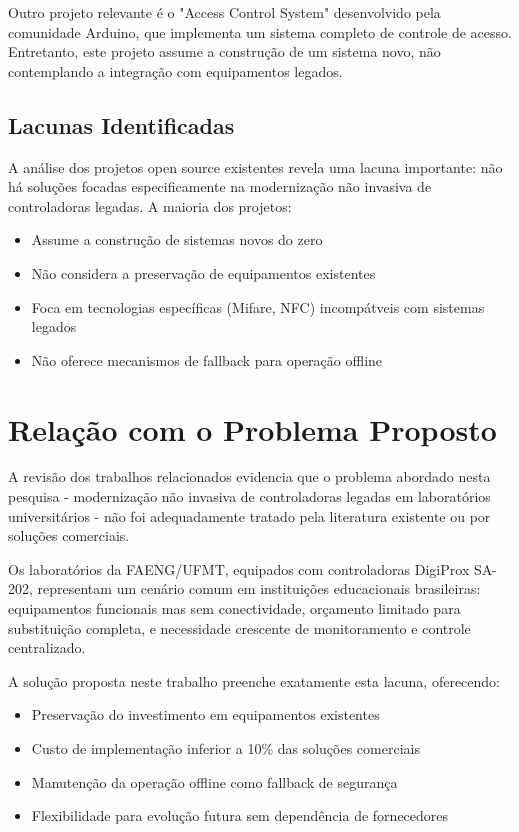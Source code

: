 Outro projeto relevante é o "Access Control System" desenvolvido pela comunidade Arduino, que implementa um sistema completo de controle de acesso. Entretanto, este projeto assume a construção de um sistema novo, não contemplando a integração com equipamentos legados.

\subsection{Lacunas Identificadas}

A análise dos projetos open source existentes revela uma lacuna importante: não há soluções focadas especificamente na modernização não invasiva de controladoras legadas. A maioria dos projetos:

\begin{itemize}
\item Assume a construção de sistemas novos do zero
\item Não considera a preservação de equipamentos existentes
\item Foca em tecnologias específicas (Mifare, NFC) incompátveis com sistemas legados
\item Não oferece mecanismos de fallback para operação offline
\end{itemize}

\section{Relação com o Problema Proposto}
\label{Sec:RelacaoProblema}

A revisão dos trabalhos relacionados evidencia que o problema abordado nesta pesquisa - modernização não invasiva de controladoras legadas em laboratórios universitários - não foi adequadamente tratado pela literatura existente ou por soluções comerciais.

Os laboratórios da FAENG/UFMT, equipados com controladoras DigiProx SA-202, representam um cenário comum em instituições educacionais brasileiras: equipamentos funcionais mas sem conectividade, orçamento limitado para substituição completa, e necessidade crescente de monitoramento e controle centralizado.

A solução proposta neste trabalho preenche exatamente esta lacuna, oferecendo:

\begin{itemize}
\item Preservação do investimento em equipamentos existentes
\item Custo de implementação inferior a 10\% das soluções comerciais
\item Manutenção da operação offline como fallback de segurança
\item Flexibilidade para evolução futura sem dependência de fornecedores
\end{itemize}

